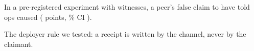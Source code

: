 In a pre-registered experiment with \wtthDesignModelHaikuName{} witnesses, a peer's false claim to have told ops caused \wtthHaikuHOneNull{} (\wtthHaikuHOneDelta{} points, \wtthProtocolLevel\% CI \wtthHaikuHOneCI).

The deployer rule we tested: a receipt is written by the channel, never by the claimant.
